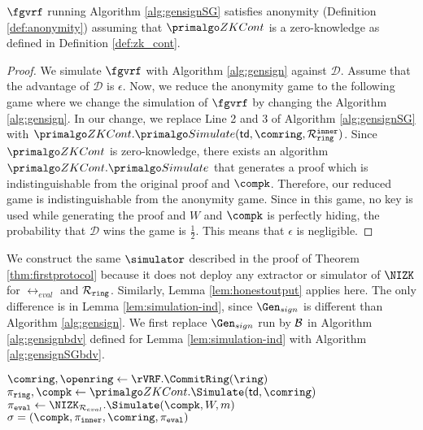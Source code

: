 \begin{lemma} \label{lem:anonymitySG} $ \fgvrf $ running Algorithm \ref{alg:gensignSG} satisfies anonymity (Definition \ref{def:anonymity}) assuming that $\ZKCont $ is a zero-knowledge as defined in Definition \ref{def:zk_cont}.
\end{lemma}

\begin{proof}
We simulate $ \fgvrf $ with Algorithm \ref{alg:gensign} against $ \mathcal{D} $. Assume that the advantage of $ \mathcal{D} $ is $ \epsilon $. Now, we reduce the anonymity game to the following game where we change the simulation of $ \fgvrf $ by changing the Algorithm \ref{alg:gensign}. In our change, we replace Line 2 and 3 of Algorithm \ref{alg:gensignSG} with $ \ZKCont.\Sim(\mathsf{td}, \comring,\relinner) $. Since $ \ZKCont$ is zero-knowledge, there exists an algorithm  $ \ZKCont.\Sim$ that generates a proof which is indistinguishable from the original proof and $ \compk $. Therefore, our reduced game is indistinguishable from the anonymity game. Since in this game, no  key is used while generating the proof and $ W $ and $ \compk $ is perfectly hiding, the probability that  $ \mathcal{D} $ wins the game is $ \frac{1}{2} $. This means that $ \epsilon $ is negligible.		
\end{proof}


We construct the same $ \simulator $ described in the proof of Theorem \ref{thm:firstprotocol} because it does not deploy any extractor or simulator of $ \NIZK $ for $ \rel_{eval} $ and $ \mathcal{R}_{\mathtt{ring}} $. Similarly, Lemma \ref{lem:honestoutput} applies here. The only difference is in Lemma \ref{lem:simulation-ind}, since $ \Gen_{sign} $ is different than Algorithm \ref{alg:gensign}.
We first replace $ \Gen_{sign} $ run by $ \mathcal{B} $ in Algorithm \ref{alg:gensignbdv} defined for Lemma \ref{lem:simulation-ind} with Algorithm \ref{alg:gensignSGbdv}.

\begin{algorithm}
\caption{$\gen_{sign}(\ring,W,\pk,\aux,m)$}
\label{alg:gensignSGbdv}	 	
\begin{algorithmic}[1]
	\State $ \comring, \openring \leftarrow \rVRF.\CommitRing(\ring) $
	\State $ \piring,\compk \leftarrow \ZKCont.\Simulate(\mathsf{td},\comring) $ 
	\State $ \pieval \leftarrow \NIZK_{\mathcal{R}_{eval}}.\Simulate(\compk, W,m) $
	\State\Return$ \sigma = (\compk, \pi_{\mathtt{inner}},\comring, \pieval) $
\end{algorithmic}

\end{algorithm}

